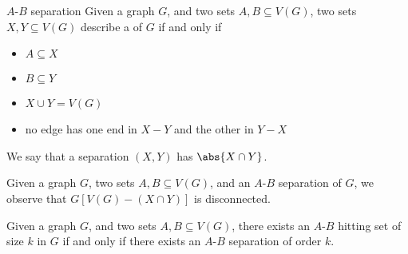 \documentclass[a4paper, 12pt]{report}
\begin{document}
    \begin{frameddefn}{$A$-$B$ separation}
        Given a graph $G$, and two sets $A, B \subseteq V(G)$, two sets $X, Y \subseteq V(G)$ describe a  of $G$ if and only if

        \begin{itemize}
            \item $A \subseteq X$
            \item $B \subseteq Y$
            \item $X \cup Y = V(G)$
            \item no edge has one end in $X - Y$ and the other in $Y - X$
        \end{itemize}
 
        We say that a separation $(X, Y)$ has  $\abs{X \cap Y}$.
    \end{frameddefn}

    Given a graph $G$, two sets $A, B \subseteq V(G)$, and an $A$-$B$ separation of $G$, we observe that $G[V(G)-(X \cap Y)]$ is disconnected.

    \begin{framedprop}[label={menger prop}]{}
        Given a graph $G$, and two sets $A, B \subseteq V(G)$, there exists an $A$-$B$ hitting set of size $k$ in $G$ if and only if there exists an $A$-$B$ separation of order $k$.
    \end{framedprop}
\end{document}
